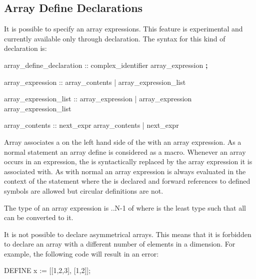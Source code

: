 \subsection{Array Define Declarations}
\label{Array Define Declarations}
%
It is possible to specify an array expressions. This
feature is experimental and currently available only through
 declaration.
%
The syntax for this kind of declaration is:
%
\begin{Grammar}
array_define_declaration ::
                   complex_identifier \operator{:=} array_expression \textbf{;}

array_expression :: \operator{[} array_contents \operator{]}
                   | \operator{[} array_expression_list \operator{]}

array_expression_list :: array_expression
                        | array_expression \operator{,} array_expression_list

array_contents :: next_expr \operator{,} array_contents
                 | next_expr
\end{Grammar}
%
Array  associates a  on the left hand
side of the  with an array expression.
%
As a normal  statement an array define is considered
as a macro.
%
Whenever an array  occurs in an expression, the
 is syntactically replaced by the array expression it is
associated with.
%
As with normal  an array  expression
is always evaluated in the context of the statement where the
 is declared and forward references to defined symbols are
allowed but circular definitions are not.

The type of an array expression  is
..N-1 of  where  is the least type such that
all  can be converted to it.


It is not possible to declare asymmetrical arrays. This means that
it is forbidden to declare an array with a different number of
elements in a dimension. For example, the following code will result
in an error:
%
\begin{nusmvCode}
DEFINE
   x := [[1,2,3], [1,2]];
\end{nusmvCode}

